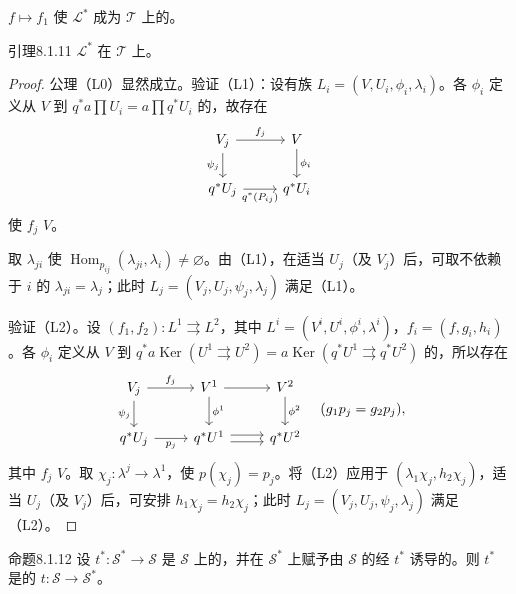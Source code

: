  $f\mapsto f_1$ 使 $\mathscr L^*$ 成为 $\mathscr T$ 上的。
\begin{SGAresult}{引理}{8.1.11}
 $\mathscr L^*$ 在 $\mathscr T$ 上。
\end{SGAresult}
\begin{proof}
公理（L0）显然成立。验证（L1）：设有族 $L_i=(V,U_i,\phi_i,\lambda_i)$。各 $\phi_i$ 定义从 $V$ 到 $q^*a\prod U_i=a\prod q^*U_i$ 的，故存在
\[\begin{tikzcd}V_j\arrow[r,"f_j"]\arrow[d,"\psi_j"']&V\arrow[d,"\phi_i"]\\q^*U_j\arrow[r,"q^*(P_{ij})"']&q^*U_i\end{tikzcd}\]
使 $f_j$  $V$。

取 $\lambda_{ji}$ 使 $\operatorname{Hom}_{p_{ij}}(\lambda_{ji},\lambda_i)\ne\varnothing$。由（L1），在适当 $U_j$（及 $V_j$）后，可取不依赖于 $i$ 的 $\lambda_{ji}=\lambda_j$；此时 $L_j=(V_j,U_j,\psi_j,\lambda_j)$ 满足（L1）。

验证（L2）。设 $(f_1,f_2):L^1\rightrightarrows L^2$，其中 $L^i=(V^i,U^i,\phi^i,\lambda^i)$，$f_i=(f,g_i,h_i)$。各 $\phi_i$ 定义从 $V$ 到 $q^*a\operatorname{Ker}(U^1\rightrightarrows U^2)=a\operatorname{Ker}(q^*U^1\rightrightarrows q^*U^2)$ 的，所以存在
\[\begin{tikzcd}V_j\arrow[r,"f_j"]\arrow[d,"\psi_j"']&V^1\arrow[r]\arrow[d,"\phi^1"]&V^2\arrow[d,"\phi^2"]\\
q^*U_j\arrow[r,"p_j"']&q^*U^1\arrow[r,shift left]\arrow[r,shift right]&q^*U^2
\end{tikzcd}\quad(g_1p_j=g_2p_j),\]
其中 $f_j$  $V$。取 $\chi_j:\lambda^j\to\lambda^1$，使 $p(\chi_j)=p_j$。将（L2）应用于 $(\lambda_1\chi_j,h_2\chi_j)$，适当 $U_j$（及 $V_j$）后，可安排 $h_1\chi_j=h_2\chi_j$；此时 $L_j=(V_j,U_j,\psi_j,\lambda_j)$ 满足（L2）。
\end{proof}
\begin{SGAresult}{命题}{8.1.12}
设 $t^*:\mathscr S^*\to\mathscr S$ 是 $\mathscr S$ 上的，并在 $\mathscr S^*$ 上赋予由 $\mathscr S$ 的经 $t^*$ 诱导的。则 $t^*$ 是的 $t:\mathscr S\to\mathscr S^*$。
\end{SGAresult}
